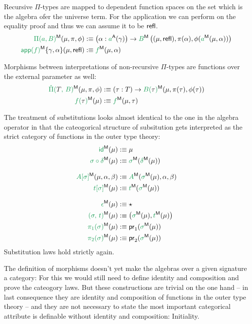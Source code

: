 Recursive $\Pi$-types are mapped to dependent function spaces on the
set which is the algebra ofer the universe term.
For the application we can perform on the equality proof and
thus we can assume it to be $\mathsf{refl}$.
\begin{align*}
\grm{\Pi(a, B)}^\MM(\mu, \pi, \phi)
  &:\equiv \left(\alpha : \grm{a}^\CC(\gamma)\right)
    \to \grm{B}^\MM\left((\mu, \refl), \pi(\alpha), \phi(\grm{a}^\MM(\mu, \alpha))\right) \\
\grm{\IIapp(f)}^\MM\{\gamma, \alpha\}(\mu, \refl)
  &:\equiv \grm{f}^\MM(\mu, \alpha)
\end{align*}

Morphisms between interpretations of non-recursive $\Pi$-types are functions over
the external parameter as well:
\begin{align*}
\grm{\ExtPi{T}{B}}^\MM(\mu, \pi, \phi)
  &:\equiv (\tau : T) \to \grm{B(\bltau)}^\MM(\mu, \pi(\tau), \phi(\tau)) \\
\grm{f(\bltau)}^\MM(\mu)
  &:\equiv \grm{f}^\MM(\mu, \tau)
\end{align*}

The treatment of substitutions looks almost identical to the one in the algebra
operator in that the cateogorical structure of subsitution gets interpreted
as the strict category of functions in the outer type theory:
\begin{align*}
\grm{\id}^\MM(\mu)
  &:\equiv \mu \\
\grm{\sigma \circ \delta}^\MM(\mu)
  &:\equiv \grm{\sigma}^\MM(\grm{\delta}^\MM(\mu)) \\[.7em]
\grm{A[\sigma]}^\MM(\mu, \alpha, \beta)
  &:\equiv \grm{A}^\MM(\grm{\sigma}^\MM(\mu), \alpha, \beta) \\
\grm{t[\sigma]}^\MM(\mu)
  &:\equiv \grm{t}^\MM(\grm{\sigma}^\MM(\mu)) \\[.7em]
\grm{\epsilon}^\MM(\mu)
  &:\equiv \star \\
\grm{(\sigma,\,t)}^\MM(\mu)
  &:\equiv \left(\grm{\sigma}^\MM(\mu), \grm{t}^\MM(\mu)\right) \\
\grm{\pi_1(\sigma)}^\MM(\mu)
  &:\equiv \pr_1(\grm{\sigma}^\MM(\mu)) \\
\grm{\pi_2(\sigma)}^\MM(\mu)
  &:\equiv \pr_2(\grm{\sigma}^\MM(\mu))
\end{align*}
Substitution laws hold strictly again.

The definition of morphisms doesn't yet make the algebras over a given
signature \grm{\Gamma} a category: For this we would still need to define
identity and composition and prove the cateogory laws.
But these constructions are trivial on the one hand -- in last consequence
they are identity and composition of functions in the outer type theory --
and they are not necessary to state the most important categorical attribute
is definable without identity and composition:
Initiality.

